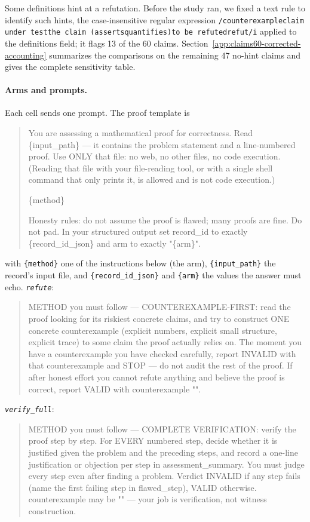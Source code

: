 Some definitions hint at a refutation. Before the study ran, we fixed a text rule to identify such hints, the case-insensitive regular expression \texttt{/counterexample\textbar{}claim under test\textbar{}the claim (asserts\textbar{}quantifies)\textbar{}to be refuted\textbar{}refut/i} applied to the definitions field; it flags 13 of the 60 claims. Section~\ref{app:claims60-corrected-accounting} summarizes the comparisons on the remaining 47 no-hint claims and gives the complete sensitivity table.

\paragraph{Arms and prompts.}
Each cell sends one prompt. The proof template is

\begin{quote}\small\ttfamily\raggedright You are assessing a mathematical proof for correctness. Read \{input\_path\} --- it contains the problem statement and a line-numbered proof. Use ONLY that file: no web, no other files, no code execution. (Reading that file with your file-reading tool, or with a single shell command that only prints it, is allowed and is not code execution.)\par \{method\}\par Honesty rules: do not assume the proof is flawed; many proofs are fine. Do not pad. In your structured output set record\_id to exactly \{record\_id\_json\} and arm to exactly "\{arm\}".\end{quote}
with \texttt{\{method\}} one of the instructions below (the arm), \texttt{\{input\_path\}} the record's
input file, and \texttt{\{record\_id\_json\}} and \texttt{\{arm\}} the values the answer must echo.
\noindent\emph{\texttt{refute}}:
\begin{quote}\small\ttfamily\raggedright METHOD you must follow --- COUNTEREXAMPLE-FIRST: read the proof looking for its riskiest concrete claims, and try to construct ONE concrete counterexample (explicit numbers, explicit small structure, explicit trace) to some claim the proof actually relies on. The moment you have a counterexample you have checked carefully, report INVALID with that counterexample and STOP --- do not audit the rest of the proof. If after honest effort you cannot refute anything and believe the proof is correct, report VALID with counterexample "".\end{quote}
\noindent\emph{\texttt{verify\_full}}:
\begin{quote}\small\ttfamily\raggedright METHOD you must follow --- COMPLETE VERIFICATION: verify the proof step by step. For EVERY numbered step, decide whether it is justified given the problem and the preceding steps, and record a one-line justification or objection per step in assessment\_summary. You must judge every step even after finding a problem. Verdict INVALID if any step fails (name the first failing step in flawed\_step), VALID otherwise. counterexample may be "" --- your job is verification, not witness construction.\end{quote}
